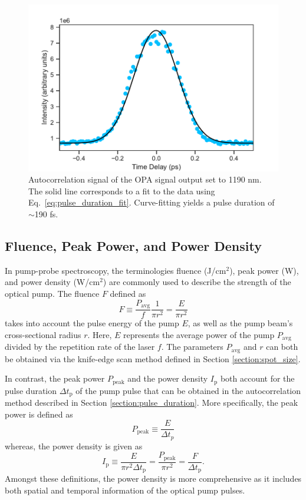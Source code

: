 \begin{figure}[ht]
	\centering
	\includegraphics[scale=0.6]{images/chapter_methods/opa_pump_autocorr}
		\caption{Autocorrelation signal of the OPA signal output set to 1190 nm. The solid line corresponds to a fit to the data using Eq.\ \eqref{eq:pulse_duration_fit}. Curve-fitting yields a pulse duration of $\sim$190 fs.}
		\label{fig:opa_autocorr}
\end{figure}

\subsection{Fluence, Peak Power, and Power Density}
In pump-probe spectroscopy, the terminologies fluence (J/cm$^2$), peak power (W), and power density (W/cm$^2$) are commonly used to describe the strength of the optical pump. The fluence $F$ defined as
\begin{equation}
	F \equiv \dfrac{P_\text{avg}}{f} \dfrac{1}{\pi r^2} = \dfrac{E}{\pi r^2}
\end{equation}
takes into account the pulse energy of the pump $E$, as well as the pump beam's cross-sectional radius $r$. Here, $E$ represents the average power of the pump $P_\text{avg}$ divided by the repetition rate of the laser $f$. The parameters $P_\text{avg}$ and $r$ can both be obtained via the knife-edge scan method defined in Section \ref{section:spot_size}.

In contrast, the peak power $P_\text{peak}$ and the power density $I_\text{p}$ both account for the pulse duration $\Delta t_\text{p}$ of the pump pulse that can be obtained in the autocorrelation method described in Section \ref{section:pulse_duration}. More specifically, the peak power is defined as
\begin{equation}
	P_\text{peak} \equiv \dfrac{E}{\Delta t_p}
\end{equation}
whereas, the power density is given as
\begin{equation}
	I_\text{p} \equiv \dfrac{E}{\pi r^2 \Delta t_\text{p}} = \dfrac{P_\text{peak}}{\pi r^2} =\dfrac{F}{\Delta t_\text{p}}.
\end{equation}
Amongst these definitions, the power density is more comprehensive as it includes both spatial and temporal information of the optical pump pulses.
